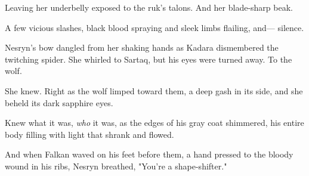 Leaving her underbelly exposed to the ruk's talons. And her blade-sharp beak.

A few vicious slashes, black blood spraying and sleek limbs flailing, and--- silence.

Nesryn's bow dangled from her shaking hands as Kadara dismembered the twitching spider. She whirled to Sartaq, but his eyes were turned away. To the wolf.

She knew. Right as the wolf limped toward them, a deep gash in its side, and she beheld its dark sapphire eyes.

Knew what it was, \emph{who} it was, as the edges of his gray coat shimmered, his entire body filling with light that shrank and flowed.

And when Falkan waved on his feet before them, a hand pressed to the bloody wound in his ribs, Nesryn breathed, "You're a shape-shifter."

